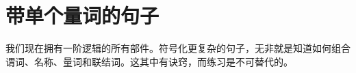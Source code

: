 \chapter{带单个量词的句子}
\label{s:MoreMonadic}

我们现在拥有一阶逻辑的所有部件。符号化更复杂的句子，无非就是知道如何组合谓词、名称、量词和联结词。这其中有诀窍，而练习是不可替代的。


